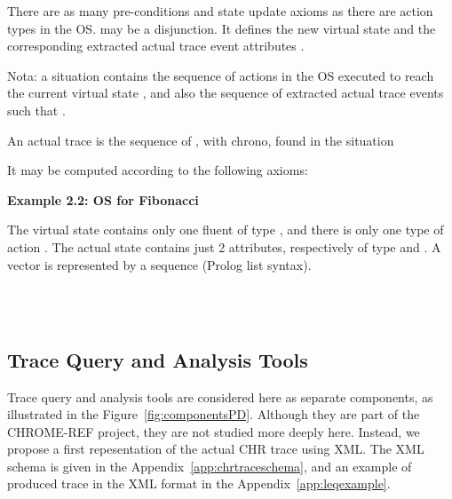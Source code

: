 There are as many pre-conditions and state update axioms as there are action types  in the OS.  may be a disjunction. It defines the new virtual state and the corresponding extracted actual trace event attributes .

\vspace{1mm}
Nota: a situation  contains the sequence of actions in the OS executed to reach the current virtual state , and also the sequence of extracted actual trace events such that .

\vspace{1mm}
An actual trace  is the sequence of , with chrono, found in the situation 




It may be computed according to the following axioms:






\vspace{4mm}
{\bf Example 2.2: OS for Fibonacci}
\label{ssec:fibSFC}

The virtual state contains only one fluent  of type , and there is only one type of action . The actual state contains just 2 attributes, respectively of type  and . A vector is represented by a sequence (Prolog list syntax).









\vspace{4mm}



 \\

 \\





\subsection{Trace Query and Analysis Tools}





Trace query and analysis tools are considered here as separate components, as illustrated in the Figure~\ref{fig:componentsPD}. Although they are part of the CHROME-REF project, they are not studied more deeply here. Instead, we propose a first repesentation of the actual CHR trace using XML. The XML schema is given in the Appendix~\ref{app:chrtraceschema}, and an example of produced trace in the XML format in the Appendix~\ref{app:leqexample}.



